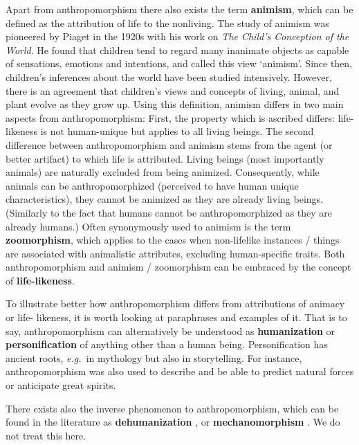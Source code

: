 \documentclass{frontiersSCNS} %
\newcommand{\eg}{{\textit{e.g.~}}}
\begin{document}
Apart from anthropomorphism there also exists the term \textbf{animism}, which can be defined as the attribution of life to the nonliving. The study of animism was pioneered by Piaget in the 1920s with his work on \textit{The Child's Conception of the  World}. He found that children tend to regard many inanimate objects as capable of sensations, emotions and intentions, and called this view `animism'. Since then, children's inferences about the world have been studied intensively. However, there is an agreement that children's views and concepts of living, animal, and plant evolve as they grow up. Using this definition, animism differs in two main aspects from anthropomorphism:
First, the property which is ascribed differs: life-likeness is not human-unique but applies to all living beings. The second difference between anthropomorphism and animism stems from the agent (or better artifact) to which life is attributed. Living beings (most importantly animals) are naturally excluded from being animized. Consequently, while animals can be anthropomorphized (perceived to have human unique characteristics), they cannot be animized as they are already living beings. (Similarly to the fact that humans cannot be anthropomorphized as they are already humans.)
Often synonymously used to animism is the term \textbf{zoomorphism}, which applies to the cases when non-lifelike instances / things are associated with animalistic attributes, excluding human-specific traits. Both anthropomorphism and animism / zoomorphism can be embraced by the concept of \textbf{life-likeness}.

To illustrate better how anthropomorphism differs from attributions of animacy or life-
likeness, it is worth looking at paraphrases and examples of it. That is to say, 
anthropomorphism can alternatively be understood as \textbf{humanization} or 
\textbf{personification} of anything other than a human being. Personification has 
ancient roots, \eg in mythology but also in storytelling. For instance, anthropomorphism was also 
used to describe and be able to predict natural forces or anticipate great spirits.

There exists also the inverse phenomenon to anthropomorphism, which can be found in the literature as \textbf{dehumanization} \citep{haslam_dehumanization:_2006}, or \textbf{mechanomorphism} \citep{caporael_anthropomorphism_1986}. We do not treat this here.

\end{document}
